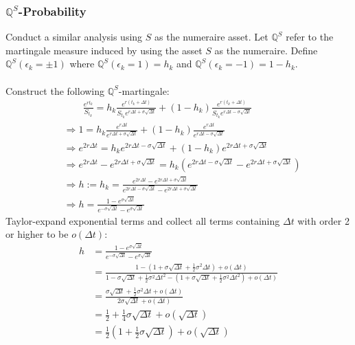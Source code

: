 \documentclass[12pt]{article}
\begin{document}
\subsubsection{$\mathbb{Q}^S$-Probability}
Conduct a similar analysis using $S$ as the numeraire asset. Let $\mathbb{Q}^S$ refer to the martingale measure induced by using the asset $S$ as the numeraire.
Define $\mathbb{Q}^S(\epsilon_k = \pm 1)$ where $\mathbb{Q}^S(\epsilon_k =1) = h_k$ and $\mathbb{Q}^S(\epsilon_k =-1) = 1-h_k$.\\ \\
Construct the following $\mathbb{Q}^S$-martingale:
\begin{align*}
  &\qquad \frac{e^{rt_k}}{S_{t_k}} = h_k\frac{e^{r(t_k+\Delta t)}}{S_{t_k}e^{r\Delta t + \sigma \sqrt{\Delta t}}} + (1-h_k)\frac{e^{r(t_k+\Delta t)}}{S_{t_k}e^{r\Delta t - \sigma \sqrt{\Delta t}}}\\
  &\Rightarrow  1 = h_k\frac{e^{r\Delta t}}{e^{r\Delta t + \sigma \sqrt{\Delta t}}} + (1-h_k) \frac{e^{r\Delta t}}{e^{r\Delta t - \sigma \sqrt{\Delta t}}} \\
  &\Rightarrow e^{2r\Delta t} = h_ke^{2r\Delta t - \sigma \sqrt{\Delta t}} + (1-h_k)e^{2r\Delta t + \sigma \sqrt{\Delta t}}\\
  &\Rightarrow e^{2r\Delta t} - e^{2r\Delta t + \sigma \sqrt{\Delta t}} = h_k(e^{2r\Delta t - \sigma \sqrt{\Delta t}} - e^{2r\Delta t + \sigma \sqrt{\Delta t}}) \\
  &\Rightarrow h:= h_k = \frac{e^{2r\Delta t} - e^{2r\Delta t + \sigma \sqrt{\Delta t}}}{e^{2r\Delta t - \sigma \sqrt{\Delta t}} - e^{2r\Delta t + \sigma \sqrt{\Delta t}}} \tag*{As $h_k$ does not depend on $k$} \\
  & \Rightarrow h = \frac{1-e^{\sigma \sqrt{\Delta t}}}{e^{-\sigma \sqrt{\Delta t}}-e^{\sigma \sqrt{\Delta t}}}
\end{align*}
Taylor-expand exponential terms and collect all terms containing $\Delta t$ with order 2 or higher to be $o(\Delta t)$:
\begin{align*}
  h &= \frac{1-e^{\sigma \sqrt{\Delta t}}}{e^{-\sigma \sqrt{\Delta t}}-e^{\sigma \sqrt{\Delta t}}} \\
    &=\frac{1-(1 + \sigma \sqrt{\Delta t} + \frac{1}{2}\sigma^2\Delta t) + o(\Delta t)}
      {1 - \sigma \sqrt{\Delta t} + \frac{1}{2}\sigma^2\Delta t^2 - (1 + \sigma \sqrt{\Delta t} + \frac{1}{2}\sigma^2\Delta t^2) + o(\Delta t)} \\
    &= \frac{\sigma \sqrt{\Delta t} + \frac{1}{2} \sigma^2\Delta t + o(\Delta t)}{2\sigma\sqrt{\Delta t} + o(\Delta t)}\\
    &= \frac{1}{2} + \frac{1}{4}\sigma\sqrt{\Delta t} + o(\sqrt{\Delta t}) \\
    &= \frac{1}{2}(1 + \frac{1}{2}\sigma\sqrt{\Delta t}) + o(\sqrt{\Delta t})
\end{align*}
\end{document}
